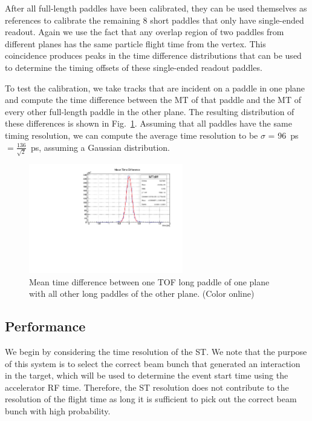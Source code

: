 After all full-length paddles have been calibrated, they can be used themselves as references to
calibrate the remaining 8 short paddles that only have single-ended readout.  Again we use the fact that any overlap region of two paddles from different
planes has the same particle flight time from the vertex. This coincidence produces peaks in the time difference distributions that can be used to determine the timing offsets of these single-ended readout paddles. 

To test the calibration, we take tracks that are incident on a paddle in one plane and compute the time difference between the MT of that paddle and the MT of every other full-length paddle in the other plane. The resulting distribution of these differences is shown in Fig.~\ref{fig:mt_diff}. Assuming that all paddles have the same timing resolution, we can compute the
average time resolution to be $\sigma$ = 96~ps$=\frac{136}{\sqrt{2}}$~ps, assuming a Gaussian distribution.
\begin{figure}[tbp]
\begin{center}
\includegraphics[width=0.6\textwidth]{figures/mt_diff_fullTOF.pdf}
\caption{\label{fig:mt_diff} Mean time difference between one TOF long paddle of one plane with all other long paddles
of the other plane. (Color online)}
\end{center}
\end{figure}

\subsection{Performance \label{sec:scperformance}}
We begin by considering the time resolution of the ST. We note that the purpose of this system is to select the correct beam bunch that generated an interaction in the target, which will be used to determine the event start time using the accelerator RF time. Therefore, the ST resolution does not contribute to the resolution of the flight time as long it is sufficient to pick out the correct beam bunch with high probability.

